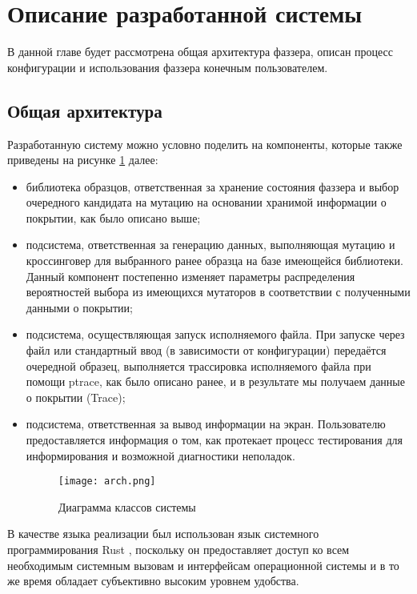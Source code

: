 \section{Описание разработанной системы}

В данной главе будет рассмотрена общая архитектура фаззера, описан процесс конфигурации и использования фаззера конечным пользователем.

\subsection{Общая архитектура}

Разработанную систему можно условно поделить на компоненты, которые также приведены на рисунке \ref{fig:arch} далее:
\begin{itemize}
	\item библиотека образцов, ответственная за хранение состояния фаззера и выбор очередного кандидата на мутацию на основании хранимой информации о покрытии, как было описано выше;
	
	\item подсистема, ответственная за генерацию данных, выполняющая мутацию и кроссинговер для выбранного ранее образца на базе имеющейся библиотеки. Данный компонент постепенно изменяет параметры распределения вероятностей выбора из имеющихся мутаторов в соответствии с полученными данными о покрытии;
	
	\item подсистема, осуществляющая запуск исполняемого файла. При запуске через файл или стандартный ввод (в зависимости от конфигурации) передаётся очередной образец, выполняется трассировка исполняемого файла при помощи ptrace, как было описано ранее, и в результате мы получаем данные о покрытии (Trace);
	
	\item подсистема, ответственная за вывод информации на экран. Пользователю предоставляется информация о том, как протекает процесс тестирования для информирования и возможной диагностики неполадок.

\begin{figure}[h]
	\centering
	\texttt{[image: arch.png]}
	\caption{Диаграмма классов системы}
	\label{fig:arch}
\end{figure}%
	
\end{itemize}

В качестве языка реализации был использован язык системного программирования Rust \cite{rust}, поскольку он предоставляет доступ ко всем необходимым системным вызовам и интерфейсам операционной системы и в то же время обладает субъективно высоким уровнем удобства.

